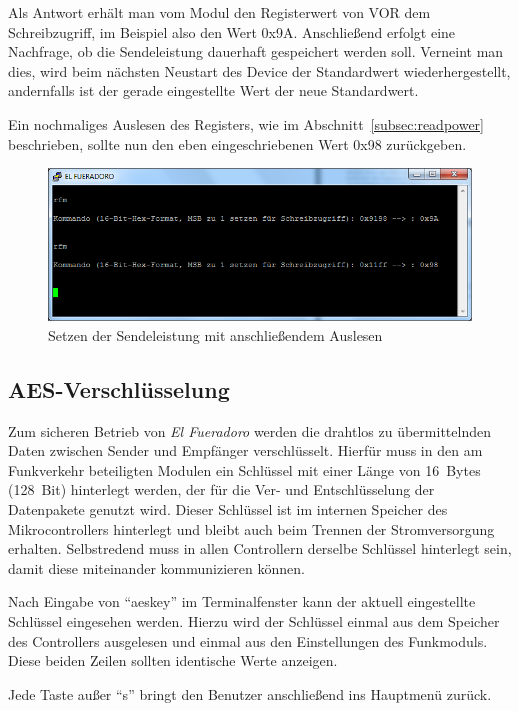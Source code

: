\documentclass[paper=a4, parskip, numbers=noenddot, toc=listof, headsepline]{scrbook}
\newcommand{\anlage}{\emph{El Fueradoro}}
\begin{document}
						Als Antwort erhält man vom Modul den Registerwert von VOR dem Schreibzugriff, im Beispiel also den Wert 0x9A. Anschließend erfolgt eine Nachfrage, ob die Sendeleistung dauerhaft gespeichert werden soll. Verneint man dies, wird beim nächsten Neustart des Device der Standardwert wiederhergestellt, andernfalls ist der gerade eingestellte Wert der neue Standardwert.

						Ein nochmaliges Auslesen des Registers, wie im Abschnitt~\ref{subsec:readpower} beschrieben, sollte nun den eben eingeschriebenen Wert 0x98 zurückgeben.

						\begin{figure}
							\centering
							\includegraphics[width=.8\textwidth]{Bilder/rfmbefehl2}
							\caption{Setzen der Sendeleistung mit anschließendem Auslesen}
							\label{fig:rfmwrite}
						\end{figure}

				\subsection{AES-Verschlüsselung}
					\label{sec:encryption}

					Zum sicheren Betrieb von {\anlage} werden die drahtlos zu übermittelnden Daten zwischen Sender und Empfänger verschlüsselt. Hierfür muss in den am Funkverkehr beteiligten Modulen ein Schlüssel mit einer Länge von 16~Bytes (128~Bit) hinterlegt werden, der für die Ver- und Entschlüsselung der Datenpakete genutzt wird. Dieser Schlüssel ist im internen Speicher des Mikrocontrollers hinterlegt und bleibt auch beim Trennen der Stromversorgung erhalten. Selbstredend muss in allen Controllern derselbe Schlüssel hinterlegt sein, damit diese miteinander kommunizieren können.

					Nach Eingabe von \enquote{aeskey} im Terminalfenster kann der aktuell eingestellte Schlüssel eingesehen werden. Hierzu wird der Schlüssel einmal aus dem Speicher des Controllers ausgelesen und einmal aus den Einstellungen des Funkmoduls. Diese beiden Zeilen sollten identische Werte anzeigen.
					
					Jede Taste außer \enquote{s} bringt den Benutzer anschließend ins Hauptmenü zurück.
\end{document}
